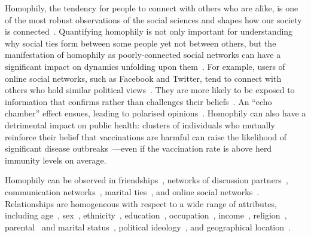 \documentclass{scrartcl}
\begin{document}
Homophily, the tendency for people to connect with others who are alike, is one of the most robust observations of the social sciences and shapes how our society is connected~\cite{McPherson2001}.
Quantifying homophily is not only important for understanding why social ties form between some people yet not between others, but the manifestation of homophily as poorly-connected social networks can have a significant impact on dynamics unfolding upon them~\cite{Golub2012}. For example, users of online social networks, such as Facebook and Twitter, tend to connect with others who hold similar political views~\cite{Boutyline2017}. They are more likely to be exposed to information that confirms rather than challenges their beliefs~\cite{Bakshy2015}. An ``echo chamber'' effect ensues, leading to polarised opinions~\cite{DeMarzo2003}. Homophily can also have a detrimental impact on public health: clusters of individuals who mutually reinforce their belief that vaccinations are harmful can raise the likelihood of significant disease outbreaks~\cite{Salathe2008}---even if the vaccination rate is above herd immunity levels on average.

Homophily can be observed in friendships~\cite{Currarini2009, Hipp2009}, networks of discussion partners~\cite{McPherson2006}, communication networks~\cite{Wang2013, Leo2016}, marital ties~\cite{Blau1984}, and online social networks~\cite{Chang2010}. Relationships are homogeneous with respect to a wide range of attributes, including age~\cite{Marsden1988,Smith2014}, sex~\cite{Stehle2011,Smith2014}, ethnicity~\cite{Chang2010, Blumenstock2013, Currarini2009}, education~\cite{McPherson2006, Smith2014,Johnson1989}, occupation~\cite{Chan2004}, income~\cite{Leo2016, Wang2013, Johnson1989}, religion~\cite{Platt2012}, parental~\cite{Johnson1989} and marital status~\cite{Kalmijn2007}, political ideology~\cite{Bakshy2015, Boutyline2017}, and geographical location~\cite{Lambiotte2008, Expert2011, Backstrom2010, Scellato2011, Illenberger2013}. %
\end{document}
